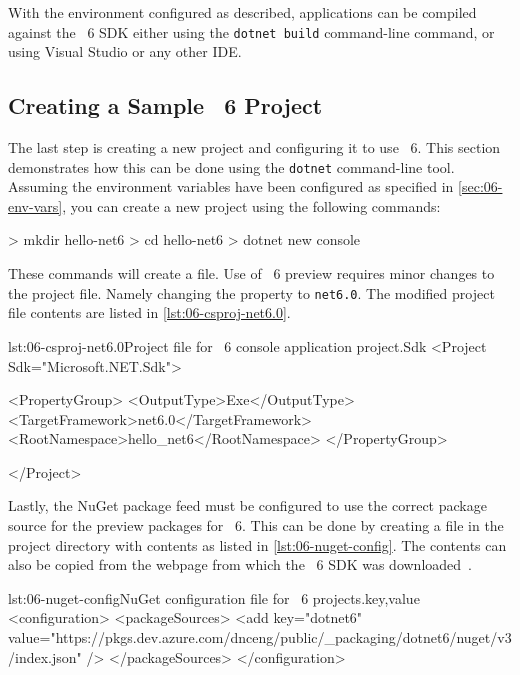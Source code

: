 With the environment configured as described, \dotnet{} applications can be compiled against the
\dotnet{}~6 SDK either using the \verb|dotnet build| command-line command, or using Visual Studio or
any other IDE\@.

\subsection{Creating a Sample \dotnet{}~6 Project}

The last step is creating a new project and configuring it to use \dotnet{}~6. This section
demonstrates how this can be done using the \verb|dotnet| command-line tool. Assuming the
environment variables have been configured as specified in \autoref{sec:06-env-vars}, you can create
a new project using the following commands:

\begin{myVerbatim}
> mkdir hello-net6
> cd hello-net6
> dotnet new console
\end{myVerbatim}

These commands will create a  file. Use of \dotnet{}~6
preview requires minor changes to the project file. Namely changing the 
property to \verb|net6.0|. The modified project file contents are listed in
\autoref{lst:06-csproj-net6.0}.

\begin{myListingXml}{lst:06-csproj-net6.0}{Project file for \dotnet{}~6 console application project.}{Sdk}
<Project Sdk="Microsoft.NET.Sdk">

  <PropertyGroup>
    <OutputType>Exe</OutputType>
    <TargetFramework>net6.0</TargetFramework>
    <RootNamespace>hello_net6</RootNamespace>
  </PropertyGroup>

</Project>
\end{myListingXml}

Lastly, the NuGet package feed must be configured to use the correct package source for the preview
packages for \dotnet{}~6. This can be done by creating a  file in the project
directory with contents as listed in \autoref{lst:06-nuget-config}. The contents can also be copied
from the webpage from which the \dotnet{}~6 SDK was downloaded~\cite{dotnetSdkGithub}.

\begin{myListingXml}[basicstyle=\ttfamily\scriptsize]{lst:06-nuget-config}{NuGet configuration file for \dotnet{}~6 projects.}{key,value}
<configuration>
  <packageSources>
    <add key="dotnet6"
      value="https://pkgs.dev.azure.com/dnceng/public/_packaging/dotnet6/nuget/v3/index.json" />
  </packageSources>
</configuration>
\end{myListingXml}

